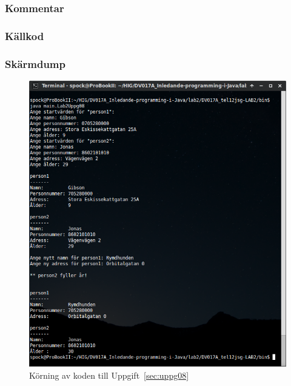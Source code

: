 \subsubsection{Kommentar}


\subsubsection{Källkod}
\label{src:uppg08}


\subsubsection{Skärmdump}
\begin{figure}[htbp]
    \centering
        \includegraphics[width=\linewidth]{img/08.png}
    \caption{Körning av koden till Uppgift~\ref{sec:uppg08}}
    \label{fig:uppg08-screenshot}
\end{figure}


